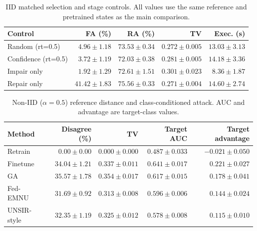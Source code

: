 \documentclass[software,article,submit,moreauthors]{Definitions/mdpi}
\begin{document}
\begin{table}[H]\centering\small
\caption{IID matched selection and stage controls. All values use the same reference and pretrained states as the main comparison.}
\label{tab:iid-controls}
\begin{tabular}{lrrrr}\toprule Control & FA (\%) & RA (\%) & TV & Exec. (s)\\\midrule
Random (rt=0.5) & $4.96 \pm 1.18$ & $73.53 \pm 0.34$ & $0.272 \pm 0.005$ & $13.03 \pm 3.13$\\
Confidence (rt=0.5) & $3.72 \pm 1.19$ & $72.03 \pm 0.38$ & $0.281 \pm 0.005$ & $14.18 \pm 3.36$\\
Impair only & $1.92 \pm 1.29$ & $72.61 \pm 1.51$ & $0.301 \pm 0.023$ & $8.36 \pm 1.87$\\
Repair only & $41.42 \pm 1.83$ & $75.56 \pm 0.33$ & $0.271 \pm 0.004$ & $14.60 \pm 2.74$\\
\bottomrule\end{tabular}\end{table}

\begin{table}[H]\centering\small
\caption{Non-IID ($\alpha=0.5$) reference distance and class-conditioned attack. AUC and advantage are target-class values.}
\label{tab:noniid-distance}
\begin{tabular}{lrrrr}\toprule Method & Disagree (\%) & TV & Target AUC & Target advantage\\\midrule
Retrain & $0.00 \pm 0.00$ & $0.000 \pm 0.000$ & $0.487 \pm 0.033$ & $-0.021 \pm 0.050$\\
Finetune & $34.04 \pm 1.21$ & $0.337 \pm 0.011$ & $0.641 \pm 0.017$ & $0.221 \pm 0.027$\\
GA & $35.57 \pm 1.78$ & $0.354 \pm 0.017$ & $0.617 \pm 0.015$ & $0.178 \pm 0.041$\\
Fed-EMNU & $31.69 \pm 0.92$ & $0.313 \pm 0.008$ & $0.596 \pm 0.006$ & $0.144 \pm 0.024$\\
UNSIR-style & $32.35 \pm 1.19$ & $0.325 \pm 0.012$ & $0.578 \pm 0.008$ & $0.115 \pm 0.010$\\
\bottomrule\end{tabular}\end{table}
\end{document}
